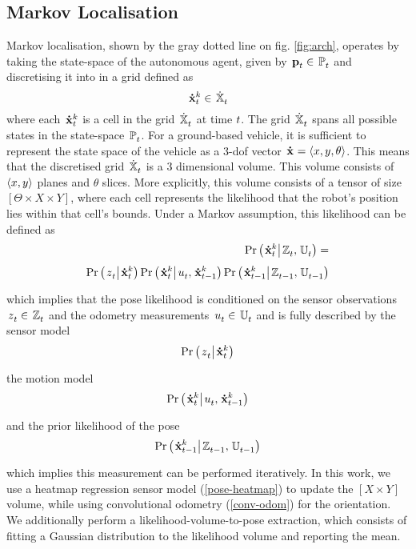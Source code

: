 \documentclass[letterpaper, 10 pt, conference]{ieeeconf}  %
\begin{document}
\subsection{Markov Localisation} \label{markov-math}
Markov localisation, shown by the gray dotted line on fig. \ref{fig:arch}, operates by taking the state-space of the autonomous agent, given by 
\ensuremath{\state{}{}{\mytime}{} \in \statespace{}{}{\mytime}{}}
and discretising it into in a grid defined as
\begin{equation}
\pose{\mytime}{k} \in \poseSet{\mytime}{}
\end{equation} 
where each \ensuremath{\pose{\mytime}{k}} is a cell in the grid \ensuremath{\poseSet{\mytime}{}} at time \ensuremath{\mytime}.
The grid \ensuremath{\poseSet{\mytime}{}} spans all possible states in the state-space \ensuremath{\statespace{}{}{\mytime}{}}.
For a ground-based vehicle, it is sufficient to represent the state space of the vehicle as a 3-\acs{dof} vector \ensuremath{\pose{}{} = \mytuple{x, y, \theta}}.
This means that the discretised grid \ensuremath{\poseSet{\mytime}{}} is a 3 dimensional volume.
This volume consists of \ensuremath{\mytuple{x,y}} planes and \ensuremath{\theta} slices.
More explicitly, this volume consists of a tensor of size \ensuremath{[\Theta \times X \times Y]}, where each cell represents the likelihood that the robot's position lies within that cell's bounds.
Under a Markov assumption, this likelihood can be defined as
\begin{equation}
\begin{split}
  \condprob{\pose{\mytime}{k}}{\obsall{\mytime}{}, \odomall{\mytime}{}} = \\
  \condprob{\obs{\mytime}{}}{\pose{\mytime}{k}} \condprob{\pose{\mytime}{k}}{\odom{\mytime}{}, \pose{\mytime-1}{k}} \condprob{\pose{\mytime-1}{k}}{\obsall{\mytime-1}{}, \odomall{\mytime-1}{}}
\end{split}
\end{equation}
which implies that the pose likelihood is conditioned on the sensor observations \ensuremath{\obs{\mytime}{} \in \obsall{\mytime}{}} and the odometry measurements \ensuremath{\odom{\mytime}{} \in \odomall{\mytime}{}} and is fully described by the sensor model
\begin{equation}
\label{sensormodel}
  \condprob{\obs{\mytime}{}}{\pose{\mytime}{k}}
\end{equation}
the motion model
\begin{equation}
\label{motionmodel}
  \condprob{\pose{\mytime}{k}}{\odom{\mytime}{}, \pose{\mytime-1}{k}}
\end{equation}
and the prior likelihood of the pose
\begin{equation}
\condprob{\pose{\mytime-1}{k}}{\obsall{\mytime-1}{}, \odomall{\mytime-1}{}}
\end{equation} 
which implies this measurement can be performed iteratively.
In this work, we use a heatmap regression sensor model (\ref{pose-heatmap}) to update the \ensuremath{[X \times Y]} volume, while using convolutional odometry (\ref{conv-odom}) for the orientation.
We additionally perform a likelihood-volume-to-pose extraction, which consists of fitting a Gaussian distribution to the likelihood volume and reporting the mean.
\end{document}
